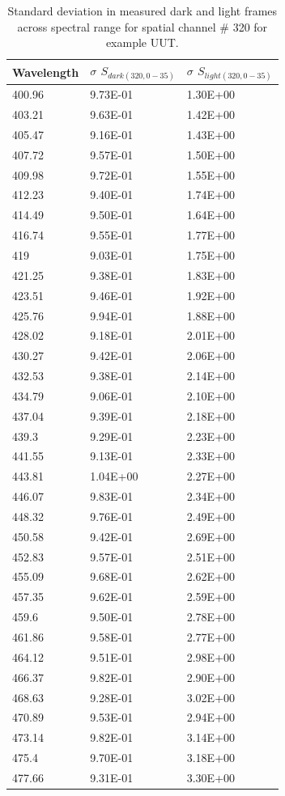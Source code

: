 \documentclass[nohyper,nobib]{tufte-book}
\begin{document}
\begin{table}[h]
\centering
\begin{tabular}{@{}lll@{}}
\toprule
Wavelength & $\sigma$ $S_{dark(320, 0-35)}$ & $\sigma$ $S_{light(320, 0-35)}$ \\ \midrule
400.96     & 9.73E-01 & 1.30E+00  \\
403.21     & 9.63E-01 & 1.42E+00  \\
405.47     & 9.16E-01 & 1.43E+00  \\
407.72     & 9.57E-01 & 1.50E+00  \\
409.98     & 9.72E-01 & 1.55E+00  \\
412.23     & 9.40E-01 & 1.74E+00  \\
414.49     & 9.50E-01 & 1.64E+00  \\
416.74     & 9.55E-01 & 1.77E+00  \\
419        & 9.03E-01 & 1.75E+00  \\
421.25     & 9.38E-01 & 1.83E+00  \\
423.51     & 9.46E-01 & 1.92E+00  \\
425.76     & 9.94E-01 & 1.88E+00  \\
428.02     & 9.18E-01 & 2.01E+00  \\
430.27     & 9.42E-01 & 2.06E+00  \\
432.53     & 9.38E-01 & 2.14E+00  \\
434.79     & 9.06E-01 & 2.10E+00  \\
437.04     & 9.39E-01 & 2.18E+00  \\
439.3      & 9.29E-01 & 2.23E+00  \\
441.55     & 9.13E-01 & 2.33E+00  \\
443.81     & 1.04E+00 & 2.27E+00  \\
446.07     & 9.83E-01 & 2.34E+00  \\
448.32     & 9.76E-01 & 2.49E+00  \\
450.58     & 9.42E-01 & 2.69E+00  \\
452.83     & 9.57E-01 & 2.51E+00  \\
455.09     & 9.68E-01 & 2.62E+00  \\
457.35     & 9.62E-01 & 2.59E+00  \\
459.6      & 9.50E-01 & 2.78E+00  \\
461.86     & 9.58E-01 & 2.77E+00  \\
464.12     & 9.51E-01 & 2.98E+00  \\
466.37     & 9.82E-01 & 2.90E+00  \\
468.63     & 9.28E-01 & 3.02E+00  \\
470.89     & 9.53E-01 & 2.94E+00  \\
473.14     & 9.82E-01 & 3.14E+00  \\
475.4      & 9.70E-01 & 3.18E+00  \\
477.66     & 9.31E-01 & 3.30E+00  \\ \bottomrule
\end{tabular}
\caption{Standard deviation in measured dark and light frames across spectral range for spatial channel \# 320 for example UUT.}
\label{tab:my-table-1}
\end{table}
\end{document}
